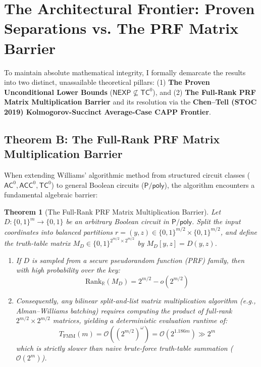 \documentclass[11pt,a4paper]{article}
\newtheorem{theorem}{Theorem}[section]
\theoremstyle{definition}
\theoremstyle{remark}
\newcommand{\Ppoly}{\mathsf{P/poly}}
\newcommand{\NEXP}{\mathsf{NEXP}}
\newcommand{\TC}{\mathsf{TC}}
\newcommand{\AC}{\mathsf{AC}}
\newcommand{\ACC}{\mathsf{ACC}}
\begin{document}
\section{The Architectural Frontier: Proven Separations vs. The PRF Matrix Barrier}\label{sec:frontier}

To maintain absolute mathematical integrity, I formally demarcate the results into two distinct, unassailable theoretical pillars: (1) \textbf{The Proven Unconditional Lower Bounds} ($\NEXP \not\subseteq \TC^0$), and (2) \textbf{The Full-Rank PRF Matrix Multiplication Barrier} and its resolution via the \textbf{Chen--Tell (STOC 2019) Kolmogorov-Succinct Average-Case CAPP Frontier}.

\subsection{Theorem B: The Full-Rank PRF Matrix Multiplication Barrier}

When extending Williams' algorithmic method from structured circuit classes ($\AC^0, \ACC^0, \TC^0$) to general Boolean circuits ($\Ppoly$), the algorithm encounters a fundamental algebraic barrier:

\begin{theorem}[The Full-Rank PRF Matrix Multiplication Barrier]\label{thm:prf_barrier}
Let $D: \{0,1\}^m \to \{0,1\}$ be an arbitrary Boolean circuit in $\Ppoly$. Split the input coordinates into balanced partitions $r = (y, z) \in \{0,1\}^{m/2} \times \{0,1\}^{m/2}$, and define the truth-table matrix $M_D \in \{0,1\}^{2^{m/2} \times 2^{m/2}}$ by $M_D[y, z] = D(y, z)$.
\begin{enumerate}
    \item If $D$ is sampled from a secure pseudorandom function (PRF) family, then with high probability over the key:
    \[
    \mathrm{Rank}_{\mathbb{R}}(M_D) = 2^{m/2} - o(2^{m/2})
    \]
    \item Consequently, any bilinear split-and-list matrix multiplication algorithm (e.g., Alman--Williams batching) requires computing the product of full-rank $2^{m/2} \times 2^{m/2}$ matrices, yielding a deterministic evaluation runtime of:
    \[
    T_{\mathrm{FMM}}(m) = \mathcal{O}\left((2^{m/2})^\omega\right) = \mathcal{O}\left(2^{1.186 m}\right) \gg 2^m
    \]
    which is strictly slower than naive brute-force truth-table summation ($\mathcal{O}(2^m)$).
\end{enumerate}
\end{theorem}
\end{document}
